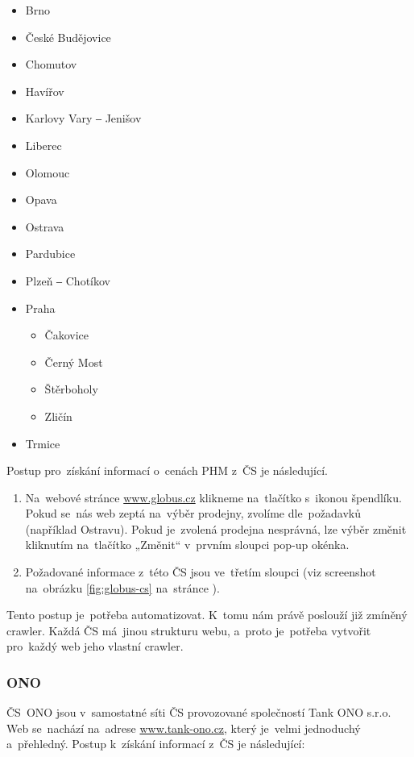 \begin{itemize}
    \item Brno
    \item České Budějovice
    \item Chomutov
    \item Havířov
    \item Karlovy Vary ‒ Jenišov
    \item Liberec
    \item Olomouc
    \item Opava
    \item Ostrava
    \item Pardubice
    \item Plzeň ‒ Chotíkov
    \item Praha
    \begin{itemize}
        \item Čakovice
        \item Černý Most
        \item Štěrboholy
        \item Zličín
    \end{itemize}
    \item Trmice
\end{itemize}

Postup pro~získání informací o~cenách PHM z~ČS je následující.

\begin{enumerate}
    \item Na~webové stránce \url{www.globus.cz} klikneme na~tlačítko s~ikonou
        špendlíku. Pokud se~nás web zeptá na~výběr prodejny, zvolíme
        dle~požadavků (například Ostravu). Pokud je~zvolená prodejna
        nesprávná, lze výběr změnit kliknutím na~tlačítko „Změnit“
        v~prvním sloupci pop-up okénka.
    \item Požadované informace z~této ČS jsou ve~třetím sloupci (viz
        screenshot na~obrázku \ref{fig:globus-cs} na~stránce
        \pageref{fig:globus-cs}).
\end{enumerate}

Tento postup je~potřeba automatizovat. K~tomu nám právě poslouží již
zmíněný crawler. Každá ČS má~jinou strukturu webu, a~proto je~potřeba
vytvořit pro~každý web jeho vlastní crawler.

\subsubsection{ONO}
\label{sec:preps-ono}

ČS~ONO jsou v~samostatné síti ČS provozované společností Tank ONO s.r.o.
Web se~nachází na~adrese \url{www.tank-ono.cz}, který je~velmi jednoduchý
a~přehledný. Postup k~získání informací z~ČS je následující:

